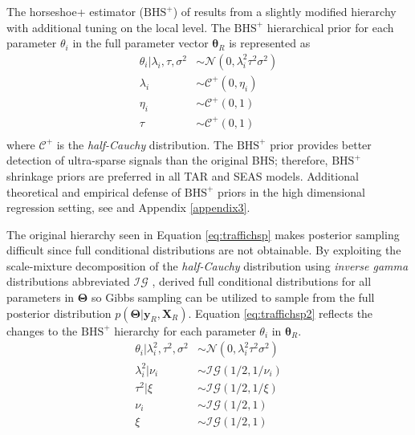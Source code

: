 The horseshoe+ estimator ($\textrm{BHS}^+$) of \cite{Bhadra2016} results from a slightly modified hierarchy with additional tuning on the local level. The $\textrm{BHS}^+$ hierarchical prior for each parameter $\theta_i$ in the full parameter vector $\bm{\theta}_R$ is represented as
\begin{equation}
\label{eq:traffichsp}
\begin{split}
	\theta_i|\lambda_i,\tau,\sigma^2 & \sim \mathcal{N}(0,\lambda^2_i\tau^2\sigma^2) \\
	\lambda_i &\sim \mathcal{C}^+(0,\eta_i)\\
	\eta_i & \sim \mathcal{C}^+(0,1)\\
	\tau &\sim \mathcal{C}^+(0,1)\\
\end{split}
\end{equation}
where $\mathcal{C}^+$ is the \textit{half-Cauchy} distribution. The $\textrm{BHS}^+$ prior provides better detection of ultra-sparse signals than the original BHS; therefore, $\textrm{BHS}^+$ shrinkage priors are preferred in all TAR and SEAS models.  Additional theoretical and empirical defense of $\textrm{BHS}^+$ priors in the high dimensional regression setting, see \cite{Bhadra2016} and Appendix \ref{appendix3}.

The original hierarchy seen in Equation \ref{eq:traffichsp} makes posterior sampling difficult since full conditional distributions are not obtainable. By exploiting the scale-mixture decomposition of the \textit{half-Cauchy} distribution using \textit{inverse gamma} distributions abbreviated $\mathcal{IG}$ \citep{Wand2011}, \cite{Makalic2016b} derived full conditional distributions for all parameters in $\bm{\Theta}$ so Gibbs sampling \citep{Geman1987,Gelfand1990} can be utilized to sample from the full posterior distribution $p(\bm{\Theta}|\bm{y}_R,\bm{X}_R)$. Equation \ref{eq:traffichsp2} reflects the changes to the $\textrm{BHS}^+$ hierarchy for each parameter $\theta_i$ in $\bm{\theta}_R$.
\begin{equation}
\label{eq:traffichsp2}
\begin{split}
\theta_i|\lambda_i^2,\tau^2,\sigma^2 & \sim \mathcal{N}(0,\lambda_i^2\tau^2\sigma^2) \\
\lambda^2_i|\nu_i & \sim \mathcal{IG}(1/2,1/\nu_i)\\
\tau^2|\xi & \sim \mathcal{IG}(1/2,1/\xi)\\
\nu_i & \sim \mathcal{IG}(1/2,1) \\
\xi & \sim \mathcal{IG}(1/2,1) \\
\end{split}
\end{equation}

